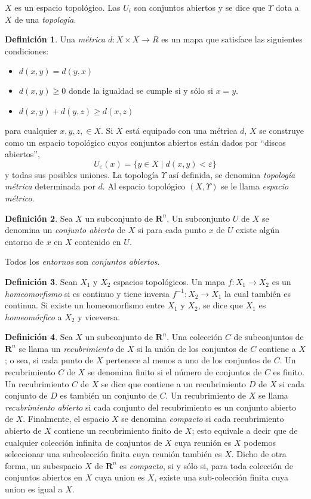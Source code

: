 \documentclass{article}
\theoremstyle{definition} \newtheorem{defi}{Definici\'on}
\theoremstyle{definition} \newtheorem{teo}{Teorema}
\theoremstyle{definition} \newtheorem{cor}{Corolario}
\begin{document}
$X$ es un espacio topol\'ogico. Las $U_i$ son conjuntos abiertos y se dice que $\Upsilon$ dota a $X$ de una \emph{topolog\'ia}.
\begin{defi}
Una \emph{m\'etrica} $d:X \times X \rightarrow R$ es un mapa que satisface las siguientes condiciones:
\begin{itemize}
\item $d(x,y)=d(y,x)$
\item $d(x,y) \geq 0$ donde la igualdad se cumple si y s\'olo si $x=y$.
\item $d(x,y) + d(y,z) \geq d(x,z)$
\end{itemize}
para cualquier $x, y, z, \in X$. Si $X$ est\'a equipado con una m\'etrica $d$, $X$ se construye como un espacio topol\'ogico cuyos conjuntos abiertos est\'an dados por ``discos abiertos'',
$$U_{\varepsilon}(x)=\{y \in X \mid d(x,y) < \varepsilon\}$$ 
y todas sus posibles uniones. La topolog\'ia $\Upsilon$ as\'i definida, se denomina \emph{topolog\'ia m\'etrica} determinada por $d$. Al espacio topol\'ogico $(X,\Upsilon)$ se le llama \emph{espacio m\'etrico}.
\end{defi}
\begin{defi}
Sea $X$ un subconjunto de $\mathbf{R}^n$. Un subconjunto $U$ de $X$ se denomina un \emph{conjunto abierto} de $X$ si para cada punto $x$ de $U$ existe alg\'un entorno de $x$ en $X$ contenido en $U$.
\end{defi}

Todos los \emph{entornos} son \emph{conjuntos abiertos}.

\begin{defi}
Sean $X_1$ y $X_2$ espacios topol\'ogicos. Un mapa $f:X_1 \rightarrow X_2$ es un \emph{homeomorfismo} si es continuo y tiene inversa $f^{-1}:X_2 \rightarrow X_1$ la cual tambi\'en es continua. Si existe un homeomorfismo entre $X_1$ y $X_2$, se dice que $X_1$ es \emph{homeom\'orfico} a $X_2$ y viceversa.
\end{defi}

\begin{defi}
Sea $X$ un subconjunto de $\mathbf{R}^n$. Una colecci\'on $C$ de subconjuntos de $\mathbf{R}^n$ se llama un \emph{recubrimiento} de $X$ si la uni\'on de los conjuntos de $C$ contiene a $X$; o sea, si cada punto de $X$ pertenece al menos a uno de los conjuntos de $C$. Un recubrimiento $C$ de $X$ se denomina finito si el n\'umero de conjuntos de $C$ es finito. Un recubrimiento $C$ de $X$ se dice que contiene a un recubrimiento $D$ de $X$ si cada conjunto de $D$ es tambi\'en un conjunto de $C$. Un recubrimiento de $X$ se llama \emph{recubrimiento abierto} si cada conjunto del recubrimiento es un conjunto abierto de $X$. Finalmente, el espacio $X$ se denomina \emph{compacto} si cada recubrimiento abierto de $X$ contiene un recubrimiento finito de $X$; esto equivale a decir que de cualquier colecci\'on infinita de conjuntos de $X$ cuya reuni\'on es $X$ podemos seleccionar una subcolecci\'on finita cuya reuni\'on tambi\'en es $X$.
Dicho de otra forma, un subespacio $X$ de $\mathbf{R}^n$ es \emph{compacto}, si y s\'olo si, para toda colecci\'on de conjuntos abiertos en $X$ cuya union es $X$, existe una sub-colecci\'on finita cuya union es igual a $X$.
\end{defi}
\end{document}
